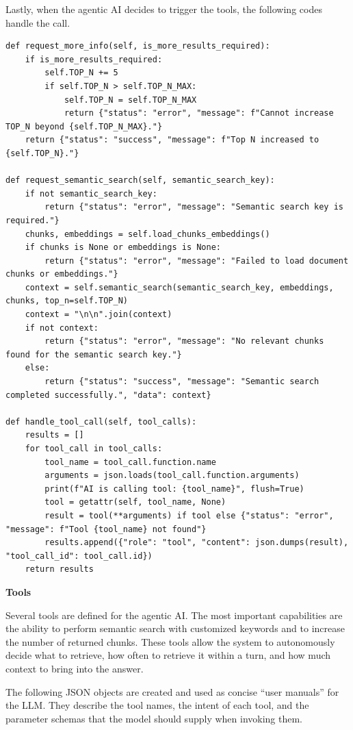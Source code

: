 Lastly, when the agentic AI decides to trigger the tools, the following codes handle the call.

\begin{lstlisting}
def request_more_info(self, is_more_results_required):
    if is_more_results_required:
        self.TOP_N += 5
        if self.TOP_N > self.TOP_N_MAX:
            self.TOP_N = self.TOP_N_MAX
            return {"status": "error", "message": f"Cannot increase TOP_N beyond {self.TOP_N_MAX}."}
    return {"status": "success", "message": f"Top N increased to {self.TOP_N}."}

def request_semantic_search(self, semantic_search_key):
    if not semantic_search_key:
        return {"status": "error", "message": "Semantic search key is required."}
    chunks, embeddings = self.load_chunks_embeddings()
    if chunks is None or embeddings is None:
        return {"status": "error", "message": "Failed to load document chunks or embeddings."}
    context = self.semantic_search(semantic_search_key, embeddings, chunks, top_n=self.TOP_N)
    context = "\n\n".join(context)
    if not context:
        return {"status": "error", "message": "No relevant chunks found for the semantic search key."}
    else:
        return {"status": "success", "message": "Semantic search completed successfully.", "data": context}
        
def handle_tool_call(self, tool_calls):
    results = []
    for tool_call in tool_calls:
        tool_name = tool_call.function.name
        arguments = json.loads(tool_call.function.arguments)
        print(f"AI is calling tool: {tool_name}", flush=True)
        tool = getattr(self, tool_name, None)
        result = tool(**arguments) if tool else {"status": "error", "message": f"Tool {tool_name} not found"}
        results.append({"role": "tool", "content": json.dumps(result), "tool_call_id": tool_call.id})
    return results
\end{lstlisting}

\vspace{0.1in}
\noindent \textbf{Tools}
\vspace{0.1in}

Several tools are defined for the agentic AI. The most important capabilities are the ability to perform semantic search with customized keywords and to increase the number of returned chunks. These tools allow the system to autonomously decide what to retrieve, how often to retrieve it within a turn, and how much context to bring into the answer.

The following JSON objects are created and used as concise ``user manuals'' for the LLM. They describe the tool names, the intent of each tool, and the parameter schemas that the model should supply when invoking them.


